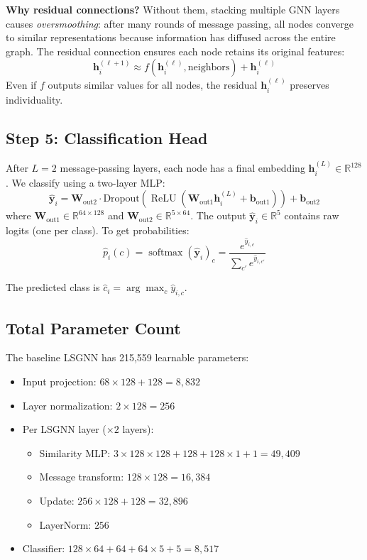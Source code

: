 \documentclass[conference]{IEEEtran}
\newcommand{\R}{\mathbb{R}}
\newcommand{\vect}[1]{\bm{#1}}
\newcommand{\mat}[1]{\mathbf{#1}}
\DeclareMathOperator{\softmax}{softmax}
\DeclareMathOperator{\ReLU}{ReLU}
\begin{document}
\textbf{Why residual connections?} Without them, stacking multiple GNN layers causes \emph{oversmoothing}: after many rounds of message passing, all nodes converge to similar representations because information has diffused across the entire graph. The residual connection ensures each node retains its original features:
\begin{equation}
    \vect{h}_i^{(\ell+1)} \approx f(\vect{h}_i^{(\ell)}, \text{neighbors}) + \vect{h}_i^{(\ell)}
\end{equation}
Even if $f$ outputs similar values for all nodes, the residual $\vect{h}_i^{(\ell)}$ preserves individuality.

\subsection{Step 5: Classification Head}

After $L = 2$ message-passing layers, each node has a final embedding $\vect{h}_i^{(L)} \in \R^{128}$. We classify using a two-layer MLP:
\begin{equation}
    \hat{\vect{y}}_i = \mat{W}_{\text{out2}} \cdot \text{Dropout}\!\left(\ReLU\!\left(\mat{W}_{\text{out1}} \vect{h}_i^{(L)} + \vect{b}_{\text{out1}}\right)\right) + \vect{b}_{\text{out2}}
\end{equation}
where $\mat{W}_{\text{out1}} \in \R^{64 \times 128}$ and $\mat{W}_{\text{out2}} \in \R^{5 \times 64}$. The output $\hat{\vect{y}}_i \in \R^5$ contains raw logits (one per class). To get probabilities:
\begin{equation}
    \hat{p}_i(c) = \softmax(\hat{\vect{y}}_i)_c = \frac{e^{\hat{y}_{i,c}}}{\sum_{c'} e^{\hat{y}_{i,c'}}}
\end{equation}

The predicted class is $\hat{c}_i = \arg\max_c \hat{y}_{i,c}$.

\subsection{Total Parameter Count}

The baseline LSGNN has 215{,}559 learnable parameters:
\begin{itemize}
    \item Input projection: $68 \times 128 + 128 = 8{,}832$
    \item Layer normalization: $2 \times 128 = 256$
    \item Per LSGNN layer ($\times 2$ layers):
    \begin{itemize}
        \item Similarity MLP: $3 \times 128 \times 128 + 128 + 128 \times 1 + 1 = 49{,}409$
        \item Message transform: $128 \times 128 = 16{,}384$
        \item Update: $256 \times 128 + 128 = 32{,}896$
        \item LayerNorm: $256$
    \end{itemize}
    \item Classifier: $128 \times 64 + 64 + 64 \times 5 + 5 = 8{,}517$
\end{itemize}
\end{document}
